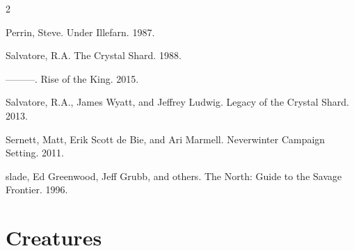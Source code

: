 \documentclass[10pt,a4paper,twoside,twocolumn,openany,bg=print,nodeprecatedcode]{dndbook}
\begin{document}
\begin{description}[nolistsep]
\begin{multicols}{2}
\item Perrin, Steve. Under Illefarn. 1987.
\item Salvatore, R.A. The Crystal Shard. 1988.
\item ———. Rise of the King. 2015.
\item Salvatore, R.A., James Wyatt, and Jeffrey Ludwig. Legacy of the Crystal Shard. 2013.
\item Sernett, Matt, Erik Scott de Bie, and Ari Marmell. Neverwinter Campaign Setting. 2011.
\item slade, Ed Greenwood, Jeff Grubb, and others. The North: Guide to the Savage Frontier. 1996.
\end{multicols}

\end{description}

\chapter{Creatures}
\end{document}
